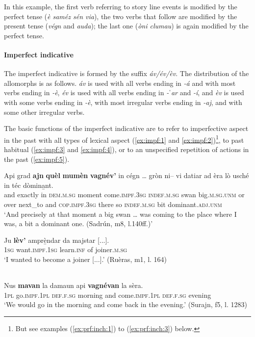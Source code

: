 In this example, the first verb referring to story line events is modified by the perfect tense (\textit{è saméz sén via}), the two verbs that follow are modified by the present tense (\textit{végn} and \textit{auda}); the last one (\textit{òni clumau}) is again modified by the perfect tense.

\paragraph{Imperfect indicative}
The imperfect indicative is formed by the suffix \textit{áv/év/èv}. The distribution of the allomorphs is as follows. \textit{áv} is used with all verbs ending in \textit{-á} and with most verbs ending in \textit{-è},  \textit{év} is used with all verbs ending in \textit{-ˈar} and \textit{-í}, and \textit{èv} is used with some verbs ending in \textit{-è}, with most irregular verbs ending in \textit{-aj}, and with some other irregular verbs.

The basic functions of the imperfect indicative are to refer to imperfective aspect in the past with all types of lexical aspect (\ref{ex:impf:1} and \ref{ex:impf:2})\footnote{But see examples (\ref{ex:prf:inch:1}) to (\ref{ex:prf:inch:3}) below.}, to past habitual (\ref{ex:impf:3} and \ref{ex:impf:4}), or to an unspecified repetition of actions in the past (\ref{ex:impf:5}).
	
\ea\label{ex:impf:1}
\gll Api grad \textbf{ajn} \textbf{quèl} \textbf{mumèn} \textbf{vagnév’} in cégn … gròn ni– vi datiar ad èra lò usché in téc dòmina̱nt.\\
and exactly in \textsc{dem.m.sg} moment come.\textsc{impf.3sg} \textsc{indef.m.sg} swan {} big.\textsc{m.sg.unm} or over next\_to and \textsc{cop.impf.3sg} there so \textsc{indef.m.sg} bit dominant.\textsc{adj.unm}\\
\glt `And precisely at that moment a big swan … was coming to the place where I was, a bit a dominant one. (Sadrún, m8, l.140ff.)'
\z

\ea\label{ex:impf:2}
\gll    Ju \textbf{lèv’} amprè̱ndar da majstar [...].\\
\textsc{1sg} want.\textsc{impf.1sg} learn.\textsc{inf} of joiner.\textsc{m.sg}\\
\glt `I wanted to become a joiner [...].' (Ruèras, m1, l. 164)
\z

\ea\label{ex:impf:3}
\\
\gll    Nus \textbf{mavan} la damaun api \textbf{vagnévan} la sèra. \\
\textsc{1pl} go.\textsc{impf.1pl}  \textsc{def.f.sg} morning and come.\textsc{impf.1pl} \textsc{def.f.sg} evening \\
\glt `We would go in the morning and come back in the evening.' (Surajn, f5, l. 1283)
\z

